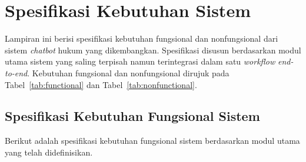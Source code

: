 \chapter{Spesifikasi Kebutuhan Sistem}
\label{app:spesifikasi}

Lampiran ini berisi spesifikasi kebutuhan fungsional dan nonfungsional dari sistem \emph{chatbot} hukum yang dikembangkan. Spesifikasi disusun berdasarkan modul utama sistem yang saling terpisah namun terintegrasi dalam satu \emph{workflow} \emph{end-to-end}. Kebutuhan fungsional dan nonfungsional dirujuk pada Tabel~\ref{tab:functional} dan Tabel~\ref{tab:nonfunctional}.

\section{Spesifikasi Kebutuhan Fungsional Sistem}

Berikut adalah spesifikasi kebutuhan fungsional sistem berdasarkan modul utama yang telah didefinisikan.

